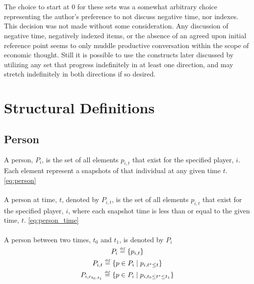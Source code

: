 \documentclass[]{article}
\newcommand{\defeq}{\stackrel{\smash{\scriptscriptstyle\mathit{def}}}{=}}
\begin{document}
\\
\\
The choice to start at $0$ for these sets was a somewhat arbitrary choice representing the author's preference to not discuss negative time, nor indexes. This decision was not made without some consideration. Any discussion of negative time, negatively indexed items, or the absence of an agreed upon initial reference point seems to only muddle productive conversation within the scope of economic thought. Still it is possible to use the constructs later discussed by utilizing any set that progress indefinitely in at least one direction, and may stretch indefinitely in both directions if so desired. 
%
\section*{Structural Definitions}
\subsection*{Person}
A person, $P_{i}$, is the set of all elements $p_{i,t}$ that exist for the specified player, $i$. Each element represent a snapshots of that individual at any given time $t$. \eqref{eq:person}
\\
\\
A person at time, $t$, denoted by $P_{i,t}$, is the set of all elements $p_{i,t}$ that exist for the specified player, $i$, where each snapshot time is less than or equal to the given time, $t$. \eqref{eq:person_time}
\\
\\
A person between two times, $t_{0}$ and $t_{1}$, is denoted by $P_{i}$
%
\begin{equation} \label{eq:person} 
P_{i} \defeq \{ p_{i,t} \} 
\end{equation}
\begin{equation} \label{eq:person_time} 
P_{i,t} \defeq \{ p \in P_{i} \mid p_{i,t^{*} \leq t} \} 
\end{equation}
\begin{equation} \label{eq:person_time_range} 
P_{i,r_{t_{0},t_{1}}} \defeq \{ p \in P_{i} \mid p_{i,t_{0} \leq t^{*} \leq t_{1}} \} 
\end{equation}    
%
\end{document}
